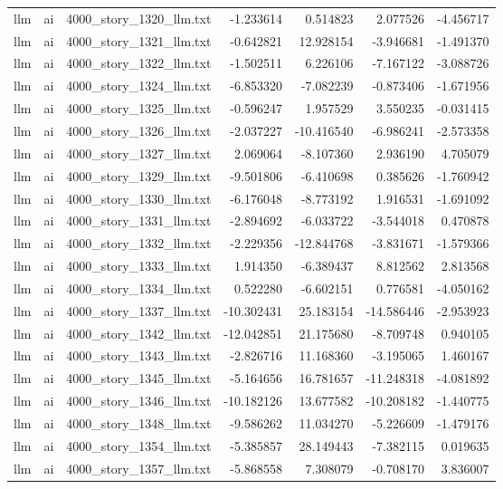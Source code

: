 \begin{longtable}{lllrrrr}
llm & ai & 4000\_story\_1320\_llm.txt & -1.233614 & 0.514823 & 2.077526 & -4.456717 \\
llm & ai & 4000\_story\_1321\_llm.txt & -0.642821 & 12.928154 & -3.946681 & -1.491370 \\
llm & ai & 4000\_story\_1322\_llm.txt & -1.502511 & 6.226106 & -7.167122 & -3.088726 \\
llm & ai & 4000\_story\_1324\_llm.txt & -6.853320 & -7.082239 & -0.873406 & -1.671956 \\
llm & ai & 4000\_story\_1325\_llm.txt & -0.596247 & 1.957529 & 3.550235 & -0.031415 \\
llm & ai & 4000\_story\_1326\_llm.txt & -2.037227 & -10.416540 & -6.986241 & -2.573358 \\
llm & ai & 4000\_story\_1327\_llm.txt & 2.069064 & -8.107360 & 2.936190 & 4.705079 \\
llm & ai & 4000\_story\_1329\_llm.txt & -9.501806 & -6.410698 & 0.385626 & -1.760942 \\
llm & ai & 4000\_story\_1330\_llm.txt & -6.176048 & -8.773192 & 1.916531 & -1.691092 \\
llm & ai & 4000\_story\_1331\_llm.txt & -2.894692 & -6.033722 & -3.544018 & 0.470878 \\
llm & ai & 4000\_story\_1332\_llm.txt & -2.229356 & -12.844768 & -3.831671 & -1.579366 \\
llm & ai & 4000\_story\_1333\_llm.txt & 1.914350 & -6.389437 & 8.812562 & 2.813568 \\
llm & ai & 4000\_story\_1334\_llm.txt & 0.522280 & -6.602151 & 0.776581 & -4.050162 \\
llm & ai & 4000\_story\_1337\_llm.txt & -10.302431 & 25.183154 & -14.586446 & -2.953923 \\
llm & ai & 4000\_story\_1342\_llm.txt & -12.042851 & 21.175680 & -8.709748 & 0.940105 \\
llm & ai & 4000\_story\_1343\_llm.txt & -2.826716 & 11.168360 & -3.195065 & 1.460167 \\
llm & ai & 4000\_story\_1345\_llm.txt & -5.164656 & 16.781657 & -11.248318 & -4.081892 \\
llm & ai & 4000\_story\_1346\_llm.txt & -10.182126 & 13.677582 & -10.208182 & -1.440775 \\
llm & ai & 4000\_story\_1348\_llm.txt & -9.586262 & 11.034270 & -5.226609 & -1.479176 \\
llm & ai & 4000\_story\_1354\_llm.txt & -5.385857 & 28.149443 & -7.382115 & 0.019635 \\
llm & ai & 4000\_story\_1357\_llm.txt & -5.868558 & 7.308079 & -0.708170 & 3.836007 \\

\end{longtable}
